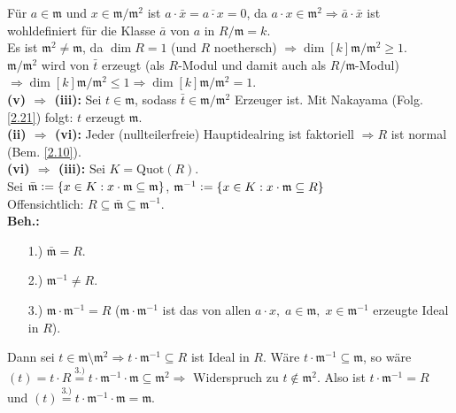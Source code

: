 \documentclass[a4paper, 10pt]{report}
\begin{document}
\begin{Bew}
Für $a \in \mathfrak{m}$ und $x \in \mathfrak{m}/\mathfrak{m}^2$ ist $a \cdot
\bar{x} = \overline{a \cdot x} = 0$, da $a \cdot x \in \mathfrak{m}^2
\Rightarrow \bar{a} \cdot \bar{x}$ ist wohldefiniert für die Klasse $\bar{a}$
von $a$ in $R/\mathfrak{m} = k$.\\
Es ist $\mathfrak{m}^2 \not= \mathfrak{m}$, da $\dim R = 1$ (und $R$ noethersch)
$\Rightarrow \dim[k]{\mathfrak{m} / \mathfrak{m}^2} \geq 1$.\\
$\mathfrak{m}/\mathfrak{m}^2$ wird von $\bar{t}$ erzeugt (als $R$-Modul und
damit auch als $R/\mathfrak{m}$-Modul) $\Rightarrow \dim[k]{\mathfrak{m}/
\mathfrak{m}^2} \leq 1 \Rightarrow \dim[k]{\mathfrak{m}/\mathfrak{m}^2} = 1$.\\
\textbf{(v) $\Rightarrow$ (iii):} Sei $t \in \mathfrak{m}$, sodass $\bar{t} \in
\mathfrak{m}/\mathfrak{m}^2$ Erzeuger ist. Mit Nakayama (Folg. \ref{2.21}) folgt:
$t$ erzeugt $\mathfrak{m}$.\\
\textbf{(ii) $\Rightarrow$ (vi):} Jeder (nullteilerfreie) Hauptidealring ist
faktoriell $\Rightarrow R$ ist normal (Bem. \ref{2.10}).\\
\textbf{(vi) $\Rightarrow$ (iii):} Sei $K = \mathrm{Quot}(R)$.\\
Sei $\bar{\mathfrak{m}} \mathrel{\mathop:}= \{x \in K: x \cdot \mathfrak{m} \subseteq
\mathfrak{m}\}$, $\mathfrak{m}^{-1} \mathrel{\mathop:}= \{x \in K: x \cdot \mathfrak{m}
\subseteq R\}$\\
Offensichtlich: $R \subseteq \bar{\mathfrak{m}} \subseteq \mathfrak{m}^{-1}$.\\
\textbf{Beh.:} \begin{enumerate}
  \item[1.)] $\bar{\mathfrak{m}} = R$.
  \item[2.)] $\mathfrak{m}^{-1} \not= R$.
  \item[3.)] $\mathfrak{m} \cdot \mathfrak{m}^{-1}=R$ ($\mathfrak{m} \cdot
  \mathfrak{m}^{-1}$ ist das von allen $a \cdot x, \; a \in \mathfrak{m}, \; x
  \in \mathfrak{m}^{-1}$ erzeugte Ideal in $R$).
\end{enumerate}
Dann sei $t \in \mathfrak{m} \setminus \mathfrak{m}^2 \Rightarrow t \cdot
\mathfrak{m}^{-1} \subseteq R$ ist Ideal in $R$.
Wäre $ t \cdot \mathfrak{m}^{-1} \subseteq \mathfrak{m}$, so wäre $(t) = t \cdot
R \overset{3.)}{=} t \cdot \mathfrak{m}^{-1} \cdot \mathfrak{m} \subseteq
\mathfrak{m}^2 \Rightarrow$ Widerspruch zu $t \not\in \mathfrak{m}^2$.
Also ist $t \cdot \mathfrak{m}^{-1} = R$ und $(t) \overset{3.)}{=} t \cdot
\mathfrak{m}^{-1} \cdot \mathfrak{m} = \mathfrak{m}$.\\

\end{Bew}
\end{document}
